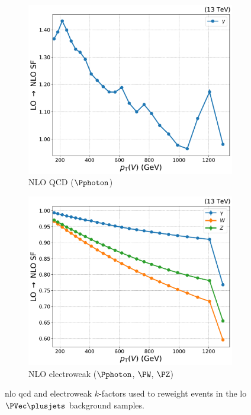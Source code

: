 \begin{figure}[htbp]
    \begin{subfigure}[b]{0.45\textwidth}
        \includegraphics[width=\textwidth]{figures/nlo_k_factors/1D_gjets_qcd.pdf}
        \caption{NLO QCD ($\Pphoton$)}
    \end{subfigure}
    \hspace{0.05\textwidth}
    \begin{subfigure}[b]{0.45\textwidth}
        \includegraphics[width=\textwidth]{figures/nlo_k_factors/1D_all_ewk.pdf}
        \caption{NLO electroweak ($\Pphoton$, $\PW$, $\PZ$)}
    \end{subfigure}
    \caption[NLO QCD and electroweak $k$-factors used to reweight events in the LO $\PVec \plusjets$ background samples]{\acrshort{nlo} \acrshort{qcd} and electroweak $k$-factors used to reweight events in the \acrshort{lo} $\PVec \plusjets$ background samples.}
    \label{fig:htoinv_nlo_k_factors}
\end{figure}


